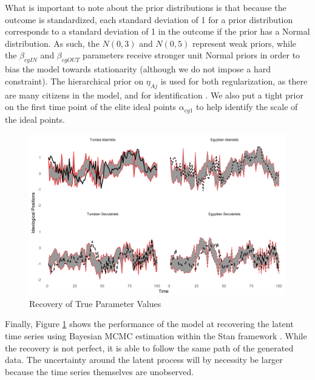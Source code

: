 \documentclass[12pt]{article}
\begin{document}
What is important to note about the prior distributions is that because the outcome is standardized, each standard deviation of 1 for a prior distribution corresponds to a standard deviation of 1 in the outcome if the prior has a Normal distribution. As such, the $N(0,3)$ and $N(0,5)$ represent weak priors, while the $\beta_{cgIN}$ and $\beta_{cgOUT}$ parameters receive stronger unit Normal priors in order to bias the model towards stationarity (although we do not impose a hard constraint). The hierarchical prior on $\eta_{Aj}$ is used for both regularization, as there are many citizens in the model, and for identification \parencite{gelman2005}. We also put a tight prior on the first time point of the elite ideal points $\alpha_{cg1}$ to help identify the scale of the ideal points.


\begin{figure}[!h]
	\caption{Recovery of True Parameter Values}\label{true_pars}
	\centering
	\includegraphics[width=.9\linewidth]{true_estimated.png}
\end{figure}

Finally, Figure \ref{true_pars} shows the performance of the model at recovering the latent time series using Bayesian MCMC estimation within the Stan framework \parencite{carpenter2017}. While the recovery is not perfect, it is able to follow the same path of the generated data. The uncertainty around the latent process will by necessity be larger because the time series themselves are unobserved.

\printbibliography
\end{document}
